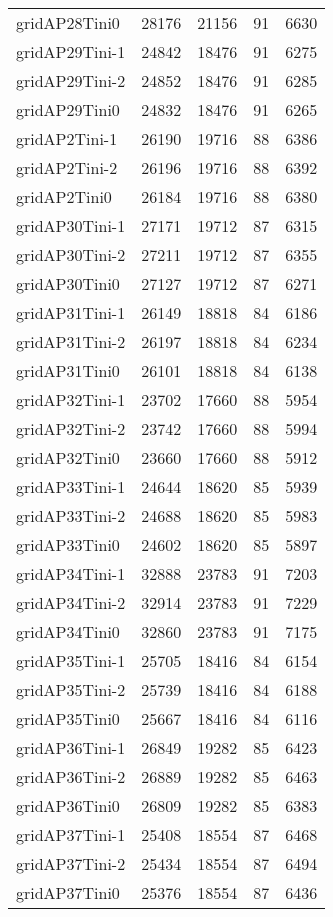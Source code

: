 \begin{longtable}{lrrrr}
gridAP28Tini0 & 28176 & 21156 & 91 & 6630 \\
gridAP29Tini-1 & 24842 & 18476 & 91 & 6275 \\
gridAP29Tini-2 & 24852 & 18476 & 91 & 6285 \\
gridAP29Tini0 & 24832 & 18476 & 91 & 6265 \\
gridAP2Tini-1 & 26190 & 19716 & 88 & 6386 \\
gridAP2Tini-2 & 26196 & 19716 & 88 & 6392 \\
gridAP2Tini0 & 26184 & 19716 & 88 & 6380 \\
gridAP30Tini-1 & 27171 & 19712 & 87 & 6315 \\
gridAP30Tini-2 & 27211 & 19712 & 87 & 6355 \\
gridAP30Tini0 & 27127 & 19712 & 87 & 6271 \\
gridAP31Tini-1 & 26149 & 18818 & 84 & 6186 \\
gridAP31Tini-2 & 26197 & 18818 & 84 & 6234 \\
gridAP31Tini0 & 26101 & 18818 & 84 & 6138 \\
gridAP32Tini-1 & 23702 & 17660 & 88 & 5954 \\
gridAP32Tini-2 & 23742 & 17660 & 88 & 5994 \\
gridAP32Tini0 & 23660 & 17660 & 88 & 5912 \\
gridAP33Tini-1 & 24644 & 18620 & 85 & 5939 \\
gridAP33Tini-2 & 24688 & 18620 & 85 & 5983 \\
gridAP33Tini0 & 24602 & 18620 & 85 & 5897 \\
gridAP34Tini-1 & 32888 & 23783 & 91 & 7203 \\
gridAP34Tini-2 & 32914 & 23783 & 91 & 7229 \\
gridAP34Tini0 & 32860 & 23783 & 91 & 7175 \\
gridAP35Tini-1 & 25705 & 18416 & 84 & 6154 \\
gridAP35Tini-2 & 25739 & 18416 & 84 & 6188 \\
gridAP35Tini0 & 25667 & 18416 & 84 & 6116 \\
gridAP36Tini-1 & 26849 & 19282 & 85 & 6423 \\
gridAP36Tini-2 & 26889 & 19282 & 85 & 6463 \\
gridAP36Tini0 & 26809 & 19282 & 85 & 6383 \\
gridAP37Tini-1 & 25408 & 18554 & 87 & 6468 \\
gridAP37Tini-2 & 25434 & 18554 & 87 & 6494 \\
gridAP37Tini0 & 25376 & 18554 & 87 & 6436 \\

\end{longtable}
